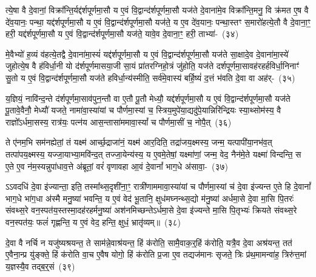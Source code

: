 त्ये॒षा वै दे॒वानां॒ विक्रा᳚न्ति॒र्यद्द॑र्\mbox{}श\-पूर्ण\-मा॒सौ य ए॒वं वि॒द्वान्द॑र्\mbox{}शपूर्णमा॒सौ यज॑ते दे॒वाना॑मे॒व विक्रा᳚न्ति॒मनु॒ वि क्र॑मत ए॒ष वै दे॑व॒यानः॒ पन्था॒ यद्द॑र्\mbox{}श\-पूर्ण\-मा॒सौ य ए॒वं वि॒द्वान्द॑र्\mbox{}शपूर्णमा॒सौ यज॑ते॒ य ए॒व दे॑व॒यानः॒ पन्था॒स्तꣳ स॒मारो॑हत्ये॒तौ वै दे॒वाना॒ꣳ॒ हरी॒ यद्द॑र्\mbox{}श\-पूर्ण\-मा॒सौ य ए॒वं वि॒द्वान्द॑र्\mbox{}शपूर्णमा॒सौ यज॑ते॒ यावे॒व दे॒वाना॒ꣳ॒ हरी॒ ताभ्या॑-~(३४)\ip

मे॒वैभ्यो॑ ह॒व्यं व॑हत्ये॒तद्वै दे॒वाना॑मा॒स्यं॑ यद्द॑र्\mbox{}श\-पूर्ण\-मा॒सौ य ए॒वं वि॒द्वान्द॑र्\mbox{}शपूर्णमा॒सौ यज॑ते सा॒क्षादे॒व दे॒वाना॑मा॒स्ये॑ जुहोत्ये॒ष वै ह॑विर्धा॒नी यो द॑र्\mbox{}शपूर्णमासया॒जी सा॒यं प्रा॑तरग्निहो॒त्रं जु॑होति॒ यज॑ते दर्\mbox{}श\-पूर्ण\-मा॒सावह॑रहर्\mbox{}हविर्धा॒निनाꣳ॑ सु॒तो य ए॒वं वि॒द्वान्द॑र्\mbox{}शपूर्णमा॒सौ यज॑ते हविर्धा॒न्य॑स्मीति॒ सर्व॑मे॒वास्य॑ बर्\mbox{}हि॒ष्यं॑ द॒त्तं भ॑वति दे॒वा वा अह॑र्-~(३५)\ip

य॒ज्ञियं॒ नावि॑न्द॒न्ते द॑र्\mbox{}शपूर्णमा॒साव॑पुन॒न्तौ वा ए॒तौ पू॒तौ मेध्यौ॒ यद्द॑र्\mbox{}श\-पूर्ण\-मा॒सौ य ए॒वं वि॒द्वान्द॑र्\mbox{}शपूर्णमा॒सौ यज॑ते पू॒तावे॒वैनौ॒ मेध्यौ॑ यजते॒ नामा॑वा॒स्या॑यां च पौर्णमा॒स्यां च॒ स्त्रिय॒मुपे॑या॒द्यदु॑पे॒यान्निरि॑न्द्रियः स्या॒थ्सोम॑स्य॒ वै राज्ञो᳚\-ऽर्धमा॒सस्य॒ रात्र॑यः॒ पत्न॑य आस॒न्तासा॑ममावा॒स्यां᳚ च पौर्णमा॒सीं च॒ नोपै॒त्~(३६)\ip

ते ए॑नम॒भि सम॑नह्येतां॒ तं यक्ष्म॑ आर्च्छ॒द्राजा॑नं॒ यक्ष्म॑ आर॒दिति॒ तद्रा॑जय॒क्ष्मस्य॒ जन्म॒ यत्पापी॑या॒नभ॑व॒त् त\-त्पा॑पय॒क्ष्मस्य॒ यज्जा॒याभ्या॒मवि॑न्द॒त् तज्जा॒येन्य॑स्य॒ य ए॒वमे॒तेषां॒ यक्ष्मा॑णां॒ जन्म॒ वेद॒ नैन॑मे॒ते यक्ष्मा॑ विन्दन्ति॒ स ए॒ते ए॒व न॑म॒स्यन्नुपा॑धाव॒त्ते अ॑ब्रूतां॒ वरं॑ वृणावहा आ॒वं दे॒वानां᳚ भाग॒धे अ॑सावा॒-~(३७)\ip

ऽ\-ऽवदधि॑ दे॒वा इ॑ज्यान्ता॒ इति॒ तस्मा᳚थ्स॒दृशी॑ना॒ꣳ॒ रात्री॑णाममावा॒स्या॑यां च पौर्णमा॒स्यां च॑ दे॒वा इ॑ज्यन्त ए॒ते हि दे॒वानां᳚ भाग॒धे भा॑ग॒धा अ॑स्मै मनु॒ष्या॑ भवन्ति॒ य ए॒वं वेद॑ भू॒तानि॒ क्षुध॑मघ्नन्थ्स॒द्यो म॑नु॒ष्या॑ अर्धमा॒से दे॒वा मा॒सि पि॒तरः॑ संवथ्स॒रे वन॒स्पत॑य॒स्तस्मा॒दह॑रहर्मनु॒ष्या॑ अश॑नमिच्छन्ते\-ऽर्धमा॒से दे॒वा इ॑ज्यन्ते मा॒सि पि॒तृभ्यः॑ क्रियते संवथ्स॒रे वन॒स्पत॑यः॒ फलं॑ गृह्णन्ति॒ य ए॒वं वेद॒ हन्ति॒ क्षुधं॒ भ्रातृ॑व्यम्॥~(३८)\ip

{\anuvakamend[{प॒श्य॒ति॒ ताभ्या॒मह॑रैदसाव॒ फलꣳ॑ स॒प्त च॑}]}

दे॒वा वै नर्चि न यजु॑ष्यश्रयन्त॒ ते साम॑न्ने॒वाश्र॑यन्त॒ हिं क॑रोति॒ सामै॒वाक॒र्॒\mbox{}हिं क॑रोति॒ यत्रै॒व दे॒वा अश्र॑यन्त॒ तत॑ ए॒वैना॒न्प्र यु॑ङ्क्ते॒ हिं क॑रोति वा॒च ए॒वैष योगो॒ हिं क॑रोति प्र॒जा ए॒व तद्यज॑मानः सृजते॒ त्रिः प्र॑थ॒मामन्वा॑ह॒ त्रिरु॑त्त॒मां य॒ज्ञस्यै॒व तद्ब॒र्॒\mbox{}सं~(३९)\ip

